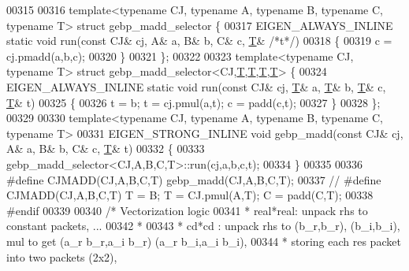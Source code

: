 \begin{DoxyCode}
00315 
00316   \textcolor{keyword}{template}<\textcolor{keyword}{typename} CJ, \textcolor{keyword}{typename} A, \textcolor{keyword}{typename} B, \textcolor{keyword}{typename} C, \textcolor{keyword}{typename} T> \textcolor{keyword}{struct }gebp\_madd\_selector \{
00317     EIGEN\_ALWAYS\_INLINE \textcolor{keyword}{static} \textcolor{keywordtype}{void} run(\textcolor{keyword}{const} CJ& cj, A& a, B& b, C& c, \hyperlink{group___sparse_core___module_class_eigen_1_1_triplet}{T}& \textcolor{comment}{/*t*/})
00318     \{
00319       c = cj.pmadd(a,b,c);
00320     \}
00321   \};
00322 
00323   \textcolor{keyword}{template}<\textcolor{keyword}{typename} CJ, \textcolor{keyword}{typename} T> \textcolor{keyword}{struct }gebp\_madd\_selector<CJ,\hyperlink{group___sparse_core___module_class_eigen_1_1_triplet}{T},\hyperlink{group___sparse_core___module_class_eigen_1_1_triplet}{T},\hyperlink{group___sparse_core___module_class_eigen_1_1_triplet}{T},\hyperlink{group___sparse_core___module_class_eigen_1_1_triplet}{T}> \{
00324     EIGEN\_ALWAYS\_INLINE \textcolor{keyword}{static} \textcolor{keywordtype}{void} run(\textcolor{keyword}{const} CJ& cj, \hyperlink{group___sparse_core___module_class_eigen_1_1_triplet}{T}& a, \hyperlink{group___sparse_core___module_class_eigen_1_1_triplet}{T}& b, \hyperlink{group___sparse_core___module_class_eigen_1_1_triplet}{T}& c, \hyperlink{group___sparse_core___module_class_eigen_1_1_triplet}{T}& t)
00325     \{
00326       t = b; t = cj.pmul(a,t); c = padd(c,t);
00327     \}
00328   \};
00329 
00330   \textcolor{keyword}{template}<\textcolor{keyword}{typename} CJ, \textcolor{keyword}{typename} A, \textcolor{keyword}{typename} B, \textcolor{keyword}{typename} C, \textcolor{keyword}{typename} T>
00331   EIGEN\_STRONG\_INLINE \textcolor{keywordtype}{void} gebp\_madd(\textcolor{keyword}{const} CJ& cj, A& a, B& b, C& c, \hyperlink{group___sparse_core___module_class_eigen_1_1_triplet}{T}& t)
00332   \{
00333     gebp\_madd\_selector<CJ,A,B,C,T>::run(cj,a,b,c,t);
00334   \}
00335 
00336 \textcolor{preprocessor}{  #define CJMADD(CJ,A,B,C,T)  gebp\_madd(CJ,A,B,C,T);}
00337 \textcolor{comment}{//   #define CJMADD(CJ,A,B,C,T)  T = B; T = CJ.pmul(A,T); C = padd(C,T);}
00338 \textcolor{preprocessor}{#endif}
00339 
00340 \textcolor{comment}{/* Vectorization logic}
00341 \textcolor{comment}{ *  real*real: unpack rhs to constant packets, ...}
00342 \textcolor{comment}{ * }
00343 \textcolor{comment}{ *  cd*cd : unpack rhs to (b\_r,b\_r), (b\_i,b\_i), mul to get (a\_r b\_r,a\_i b\_r) (a\_r b\_i,a\_i b\_i),}
00344 \textcolor{comment}{ *          storing each res packet into two packets (2x2),}

\end{DoxyCode}
